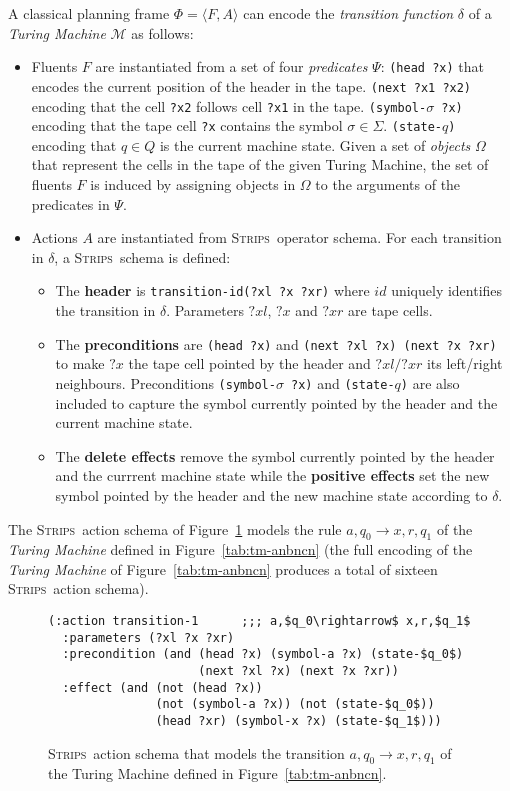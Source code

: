 \documentclass[letterpaper]{article} %
\newcommand{\tup}[1]{{\langle #1 \rangle}}
\newcommand{\strips}{\textsc{Strips}}     %
\begin{document}
A classical planning frame $\Phi=\tup{F,A}$ can encode the {\em transition function} $\delta$ of a {\em Turing Machine} $\mathcal{M}$ as follows:
\begin{itemize}
\item Fluents $F$ are instantiated from a set of four {\em predicates} $\Psi$: {\small\tt (head ?x)} that encodes the current position of the header in the tape. {\small\tt (next ?x1 ?x2)} encoding that the cell {\tt ?x2} follows cell {\tt ?x1} in the tape. {\small\tt (symbol-$\sigma$ ?x)} encoding that the tape cell {\tt ?x} contains the symbol $\sigma\in\Sigma$. {\small\tt (state-$q$)} encoding that $q\in Q$ is the current machine state. Given a set of {\em objects} $\Omega$ that represent the cells in the tape of the given Turing Machine, the set of fluents $F$ is induced by assigning objects in $\Omega$ to the arguments of the predicates in $\Psi$.
\item Actions $A$ are instantiated from \strips\ operator schema. For each transition in $\delta$, a \strips\ schema is defined:
\begin{itemize}
\item The {\bf header} is {\small\tt transition-id(?xl ?x ?xr)} where $id$ uniquely identifies the transition in $\delta$. Parameters $?xl$, $?x$ and $?xr$ are tape cells.
\item The {\bf preconditions} are {\small\tt(head ?x)} and {\small\tt (next ?xl ?x) (next ?x ?xr)} to make $?x$ the tape cell pointed by the header and $?xl/?xr$ its left/right neighbours. Preconditions {\small\tt(symbol-$\sigma$ ?x)} and {\small\tt (state-$q$)} are also included to capture the symbol currently pointed by the header and the current machine state.
\item The {\bf delete effects} remove the symbol currently pointed by the header and the currrent machine state while the {\bf positive effects} set the new symbol pointed by the header and the new machine state according to $\delta$.
\end{itemize}
\end{itemize}

The \strips\ action schema of Figure~\ref{fig:update-rule} models the rule $a,q_0\rightarrow x,r,q_1$ of the {\em Turing Machine} defined in Figure~\ref{tab:tm-anbncn} (the full encoding of the {\em Turing Machine} of Figure~\ref{tab:tm-anbncn} produces a total of sixteen \strips\ action schema). 
\begin{figure}
\begin{scriptsize}
\begin{lstlisting}
(:action transition-1      ;;; a,$q_0\rightarrow$ x,r,$q_1$
  :parameters (?xl ?x ?xr)
  :precondition (and (head ?x) (symbol-a ?x) (state-$q_0$)
                     (next ?xl ?x) (next ?x ?xr))
  :effect (and (not (head ?x)) 
               (not (symbol-a ?x)) (not (state-$q_0$))
               (head ?xr) (symbol-x ?x) (state-$q_1$)))
\end{lstlisting}
\end{scriptsize}
 \caption{\small \strips\ action schema that models the transition $a,q_0\rightarrow x,r,q_1$ of the Turing Machine defined in Figure~\ref{tab:tm-anbncn}.}
\label{fig:update-rule}
\end{figure}
\end{document}
